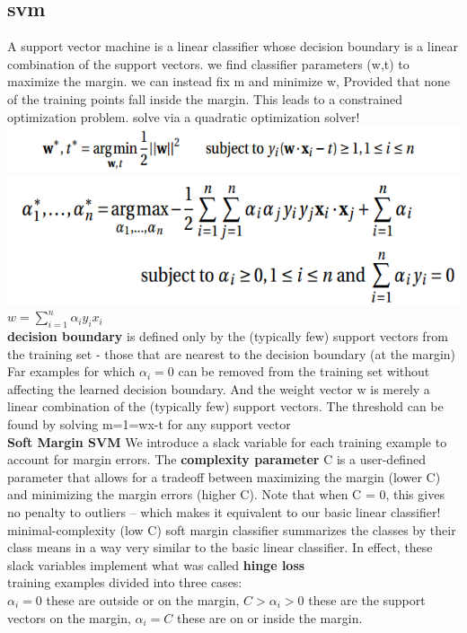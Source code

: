 \documentclass[cheatsheet.tex]{subfiles}
\begin{document}
\subsection{svm}
A support vector machine is a linear classifier whose decision boundary is a linear combination of the support vectors. we find classifier parameters (w,t) to maximize the margin. we can instead fix  m and minimize w, Provided that none of the training points fall inside the margin. This leads to a constrained optimization problem. solve via a quadratic optimization solver!
\\
\includegraphics[width=.7\linewidth]{svm0.png}
\includegraphics[width=.7\linewidth]{svm.png}\\
$w=\sum^n_{i=1}\alpha_iy_ix_i$
\\
\textbf{decision boundary} is defined only by the (typically few) support vectors from the training set - those that are nearest to the decision boundary (at the margin) Far examples  for which $\alpha_i = 0$ can be removed from the training set without affecting the learned decision boundary. And the weight vector w is merely a linear combination of the (typically few) support vectors. The threshold  can be found by solving m=1=wx-t for any support vector 
\\
\textbf{Soft Margin SVM} 
We introduce a slack variable  for each training example to account for margin errors. The \textbf{complexity parameter} C is a user-defined parameter that allows for a tradeoff between maximizing the margin (lower C) and minimizing the margin errors (higher C). Note that when C = 0, this gives no penalty to outliers -- which makes it equivalent to our basic linear classifier!  minimal-complexity (low C) soft margin classifier summarizes the classes by their class means in a way very similar to the basic linear classifier. In effect, these slack variables implement what was called \textbf{hinge loss}\\
 training examples divided into three cases:\\
$\alpha_i=0$ these are outside or on the margin, $C>\alpha_i>0$ these are the support vectors on the margin, $\alpha_i=C$ these are on or inside the margin.
\end{document}
